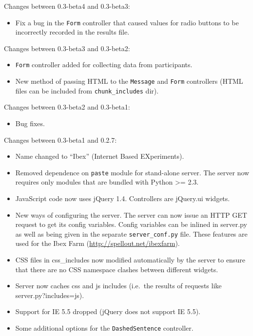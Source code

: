 \documentclass[]{article}
\begin{document}
Changes between 0.3-beta4 and 0.3-beta3:

\begin{itemize}
\itemsep1pt\parskip0pt
\item
  Fix a bug in the \texttt{Form} controller that caused values for radio
  buttons to be incorrectly recorded in the results file.
\end{itemize}

Changes between 0.3-beta3 and 0.3-beta2:

\begin{itemize}
\itemsep1pt\parskip0pt
\item
  \texttt{Form} controller added for collecting data from participants.
\item
  New method of passing HTML to the \texttt{Message} and \texttt{Form}
  controllers (HTML files can be included from \texttt{chunk\_includes}
  dir).
\end{itemize}

Changes between 0.3-beta2 and 0.3-beta1:

\begin{itemize}
\itemsep1pt\parskip0pt
\item
  Bug fixes.
\end{itemize}

Changes between 0.3-beta1 and 0.2.7:

\begin{itemize}
\itemsep1pt\parskip0pt
\item
  Name changed to ``Ibex'' (Internet Based EXperiments).
\item
  Removed dependence on \texttt{paste} module for stand-alone server.
  The server now requires only modules that are bundled with Python
  \textgreater{}= 2.3.
\item
  JavaScript code now uses jQuery 1.4. Controllers are jQuery.ui
  widgets.
\item
  New ways of configuring the server. The server can now issue an HTTP
  GET request to get its config variables. Config variables can be
  inlined in server.py as well as being given in the separate
  \texttt{server\_conf.py} file. These features are used for the Ibex
  Farm (\url{http://spellout.net/ibexfarm}).
\item
  CSS files in css\_includes now modified automatically by the server to
  ensure that there are no CSS namespace clashes between different
  widgets.
\item
  Server now caches css and js includes (i.e.~the results of requests
  like server.py?includes=js).
\item
  Support for IE 5.5 dropped (jQuery does not support IE 5.5).
\item
  Some additional options for the \texttt{DashedSentence} controller.
\end{itemize}
\end{document}
